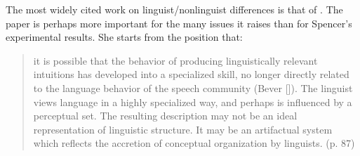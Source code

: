 The most widely cited work on linguist/nonlinguist differences is that of \citet{Spencer1973}. The paper is perhaps more important for the many issues it raises than for Spencer's experimental results. She starts from the position that:

\begin{quote}
it is possible that the behavior of producing linguistically relevant intuitions has developed into a specialized skill, no longer directly related to the language behavior of the speech community (Bever [\citeyear{Bever1970a}]).
The linguist views language in a highly specialized way, and perhaps is influenced by a perceptual set. The resulting description may not be an ideal representation of linguistic structure. It may be an artifactual system which reflects the accretion of conceptual organization by linguists. (p. 87)
\end{quote}

